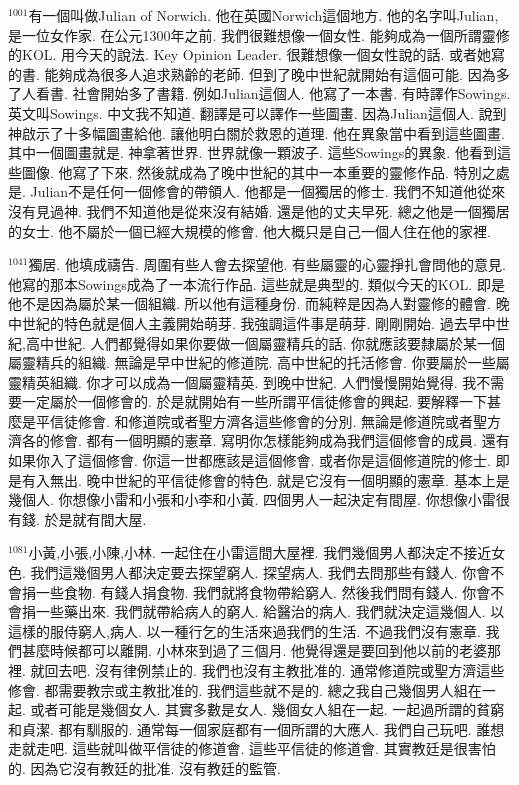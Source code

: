 \documentclass{book}
\begin{document}
$^{1001}$有一個叫做Julian of Norwich.
他在英國Norwich這個地方.
他的名字叫Julian,是一位女作家.
在公元1300年之前.
我們很難想像一個女性.
能夠成為一個所謂靈修的KOL.
用今天的說法.
Key Opinion Leader.
很難想像一個女性說的話.
或者她寫的書.
能夠成為很多人追求熟齡的老師.
但到了晚中世紀就開始有這個可能.
因為多了人看書.
社會開始多了書籍.
例如Julian這個人.
他寫了一本書.
有時譯作Sowings.
英文叫Sowings.
中文我不知道.
翻譯是可以譯作一些圖畫.
因為Julian這個人.
說到神啟示了十多幅圖畫給他.
讓他明白關於救恩的道理.
他在異象當中看到這些圖畫.
其中一個圖畫就是.
神拿著世界.
世界就像一顆波子.
這些Sowings的異象.
他看到這些圖像.
他寫了下來.
然後就成為了晚中世紀的其中一本重要的靈修作品.
特別之處是.
Julian不是任何一個修會的帶領人.
他都是一個獨居的修士.
我們不知道他從來沒有見過神.
我們不知道他是從來沒有結婚.
還是他的丈夫早死.
總之他是一個獨居的女士.
他不屬於一個已經大規模的修會.
他大概只是自己一個人住在他的家裡.

$^{1041}$獨居.
他填成禱告.
周圍有些人會去探望他.
有些屬靈的心靈掙扎會問他的意見.
他寫的那本Sowings成為了一本流行作品.
這些就是典型的.
類似今天的KOL.
即是他不是因為屬於某一個組織.
所以他有這種身份.
而純粹是因為人對靈修的體會.
晚中世紀的特色就是個人主義開始萌芽.
我強調這件事是萌芽.
剛剛開始.
過去早中世紀,高中世紀.
人們都覺得如果你要做一個屬靈精兵的話.
你就應該要隸屬於某一個屬靈精兵的組織.
無論是早中世紀的修道院.
高中世紀的托活修會.
你要屬於一些屬靈精英組織.
你才可以成為一個屬靈精英.
到晚中世紀.
人們慢慢開始覺得.
我不需要一定屬於一個修會的.
於是就開始有一些所謂平信徒修會的興起.
要解釋一下甚麼是平信徒修會.
和修道院或者聖方濟各這些修會的分別.
無論是修道院或者聖方濟各的修會.
都有一個明顯的憲章.
寫明你怎樣能夠成為我們這個修會的成員.
還有如果你入了這個修會.
你這一世都應該是這個修會.
或者你是這個修道院的修士.
即是有入無出.
晚中世紀的平信徒修會的特色.
就是它沒有一個明顯的憲章.
基本上是幾個人.
你想像小雷和小張和小李和小黃.
四個男人一起決定有間屋.
你想像小雷很有錢.
於是就有間大屋.

$^{1081}$小黃,小張,小陳,小林.
一起住在小雷這間大屋裡.
我們幾個男人都決定不接近女色.
我們這幾個男人都決定要去探望窮人.
探望病人.
我們去問那些有錢人.
你會不會捐一些食物.
有錢人捐食物.
我們就將食物帶給窮人.
然後我們問有錢人.
你會不會捐一些藥出來.
我們就帶給病人的窮人.
給醫治的病人.
我們就決定這幾個人.
以這樣的服侍窮人,病人.
以一種行乞的生活來過我們的生活.
不過我們沒有憲章.
我們甚麼時候都可以離開.
小林來到過了三個月.
他覺得還是要回到他以前的老婆那裡.
就回去吧.
沒有律例禁止的.
我們也沒有主教批准的.
通常修道院或聖方濟這些修會.
都需要教宗或主教批准的.
我們這些就不是的.
總之我自己幾個男人組在一起.
或者可能是幾個女人.
其實多數是女人.
幾個女人組在一起.
一起過所謂的貧窮和貞潔.
都有馴服的.
通常每一個家庭都有一個所謂的大應人.
我們自己玩吧.
誰想走就走吧.
這些就叫做平信徒的修道會.
這些平信徒的修道會.
其實教廷是很害怕的.
因為它沒有教廷的批准.
沒有教廷的監管.
\end{document}
